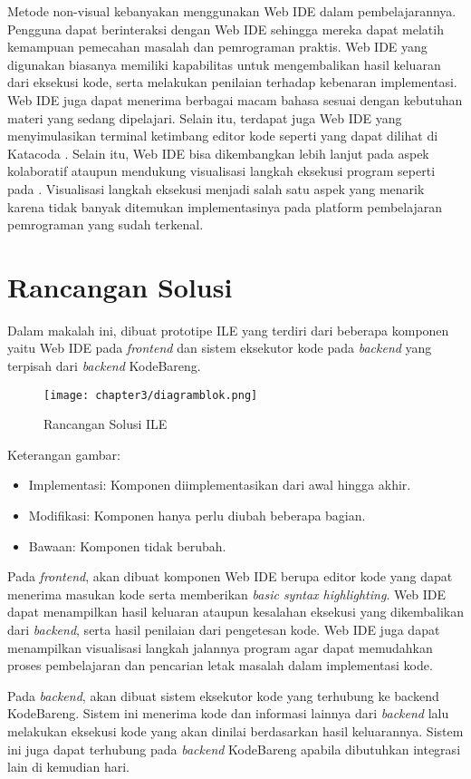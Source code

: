Metode non-visual kebanyakan menggunakan Web IDE dalam pembelajarannya. Pengguna dapat berinteraksi dengan Web IDE sehingga mereka dapat melatih kemampuan pemecahan masalah dan pemrograman praktis. Web IDE yang digunakan biasanya memiliki kapabilitas untuk mengembalikan hasil keluaran dari eksekusi kode, serta melakukan penilaian terhadap kebenaran implementasi. Web IDE juga dapat menerima berbagai macam bahasa sesuai dengan kebutuhan materi yang sedang dipelajari. Selain itu, terdapat juga Web IDE yang menyimulasikan terminal ketimbang editor kode seperti yang dapat dilihat di Katacoda \parencite{katacoda2021media}. Selain itu, Web IDE bisa dikembangkan lebih lanjut pada aspek kolaboratif \parencite{tran2013interactive} ataupun mendukung visualisasi langkah eksekusi program seperti pada \textcite{guo2013pythontutor}. Visualisasi langkah eksekusi menjadi salah satu aspek yang menarik karena tidak banyak ditemukan implementasinya pada platform pembelajaran pemrograman yang sudah terkenal.

\section{Rancangan Solusi}
Dalam makalah ini, dibuat prototipe ILE yang terdiri dari beberapa komponen yaitu Web IDE pada \textit{frontend} dan sistem eksekutor kode pada \textit{backend} yang terpisah dari \textit{backend} KodeBareng.

\begin{figure}[H]
  \centering
  \texttt{[image: chapter3/diagramblok.png]}
  \caption{Rancangan Solusi ILE}
\end{figure}

Keterangan gambar:
\begin{itemize}
  \setlength\itemsep{-0.2cm}
  \item Implementasi: Komponen diimplementasikan dari awal hingga akhir.
  \item Modifikasi: Komponen hanya perlu diubah beberapa bagian.
  \item Bawaan: Komponen tidak berubah.
\end{itemize}

Pada \textit{frontend}, akan dibuat komponen Web IDE berupa editor kode yang dapat menerima masukan kode serta memberikan \textit{basic syntax highlighting}. Web IDE dapat menampilkan hasil keluaran ataupun kesalahan eksekusi yang dikembalikan dari \textit{backend}, serta hasil penilaian dari pengetesan kode. Web IDE juga dapat menampilkan visualisasi langkah jalannya program agar dapat memudahkan proses pembelajaran dan pencarian letak masalah dalam implementasi kode.

Pada \textit{backend}, akan dibuat sistem eksekutor kode yang terhubung ke backend KodeBareng. Sistem ini menerima kode dan informasi lainnya dari \textit{backend} lalu melakukan eksekusi kode yang akan dinilai berdasarkan hasil keluarannya. Sistem ini juga dapat terhubung pada \textit{backend} KodeBareng apabila dibutuhkan integrasi lain di kemudian hari.